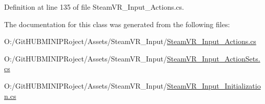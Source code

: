 Definition at line 135 of file Steam\+V\+R\+\_\+\+Input\+\_\+\+Actions.\+cs.



The documentation for this class was generated from the following files\+:\begin{DoxyCompactItemize}
\item 
O\+:/\+Git\+H\+U\+B\+M\+I\+N\+I\+P\+Roject/\+Assets/\+Steam\+V\+R\+\_\+\+Input/\mbox{\hyperlink{_steam_v_r___input___actions_8cs}{Steam\+V\+R\+\_\+\+Input\+\_\+\+Actions.\+cs}}\item 
O\+:/\+Git\+H\+U\+B\+M\+I\+N\+I\+P\+Roject/\+Assets/\+Steam\+V\+R\+\_\+\+Input/\mbox{\hyperlink{_steam_v_r___input___action_sets_8cs}{Steam\+V\+R\+\_\+\+Input\+\_\+\+Action\+Sets.\+cs}}\item 
O\+:/\+Git\+H\+U\+B\+M\+I\+N\+I\+P\+Roject/\+Assets/\+Steam\+V\+R\+\_\+\+Input/\mbox{\hyperlink{_steam_v_r___input___initialization_8cs}{Steam\+V\+R\+\_\+\+Input\+\_\+\+Initialization.\+cs}}\end{DoxyCompactItemize}
